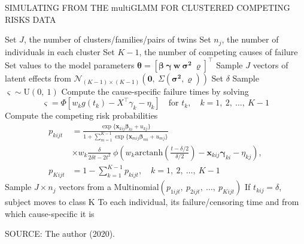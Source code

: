 \begin{algorithm}[H]
  \caption{SIMULATING FROM THE \(\text{multiGLMM}\) FOR CLUSTERED
    COMPETING RISKS DATA}
  \label{alg:algo}
\begin{algorithmic}[1]
    \State
    Set \(J\), the number of clusters/families/pairs of twins
    \State
    Set \(n_{j}\), the number of individuals in each cluster
    \State
    Set \(K-1\), the number of competing causes of failure
    \State
    Set values to the model parameters \(\bm{\theta} =
    [\bm{\beta}~\bm{\gamma}~\bm{w}~\bm{\sigma^{2}}~\bm{\varrho}]^{\top}\)
    \State
    Sample \(J\) vectors of latent effects from
    \(\mathcal{N}_{(K-1)\times(K-1)}(\bm{0}, ~\Sigma(\bm{\sigma^{2}},
    \bm{\varrho}))\)
    \State
    Set \(\delta\)
    \State
    Sample \(\varsigma\sim\text{U}(0,~1)\)
    \State
    Compute the cause-specific failure times by solving
    \[
      \varsigma = \Phi[w_{k} g(t_{k}) - X^{\top}\gamma_{k} - \eta_{k}]
      \quad\text{for } t_{k}, \quad k = 1,~2,~\dots,~K - 1
    \]
    \State
    Compute the competing risk probabilities
    \begin{align*}
      p_{kijt}
      &= \frac{\exp\{\bm{x}_{kij}\bm{\beta}_{ki} + u_{kj}\}}{
        1 +
        \sum_{m=1}^{K-1}\exp\{\bm{x}_{mij}\bm{\beta}_{mi} + u_{mj}\}}\\
      &\times
        w_{k}\frac{\delta}{2\delta t - 2t^{2}}~
        \phi\left(
        w_{k}
        \text{arctanh}\left(\frac{t-\delta/2}{\delta/2}\right)
        - \bm{x}_{kij}\bm{\gamma}_{ki} - \eta_{kj}
        \right),\\
      p_{Kijt}
      &= 1 - \sum_{k = 1}^{K - 1} p_{kijt}, \quad k = 1,~2,~\dots,~K -1
    \end{align*}
    \State
    Sample \(J\times n_{j}\) vectors from a
    \(\text{Multinomial}(p_{1ijt},~p_{2ijt},~\dots,~p_{Kijt})\)
    \State
    If \(t_{kij} = \delta\), subject moves to class K
    \State
    \Return
    To each individual, its failure/censoring time and from which
    cause-specific it is
  \end{algorithmic}
\end{algorithm}
\vspace{-.75cm}
\begin{footnotesize}
  \begin{center}
    SOURCE: The author (2020).
  \end{center}
\end{footnotesize}

